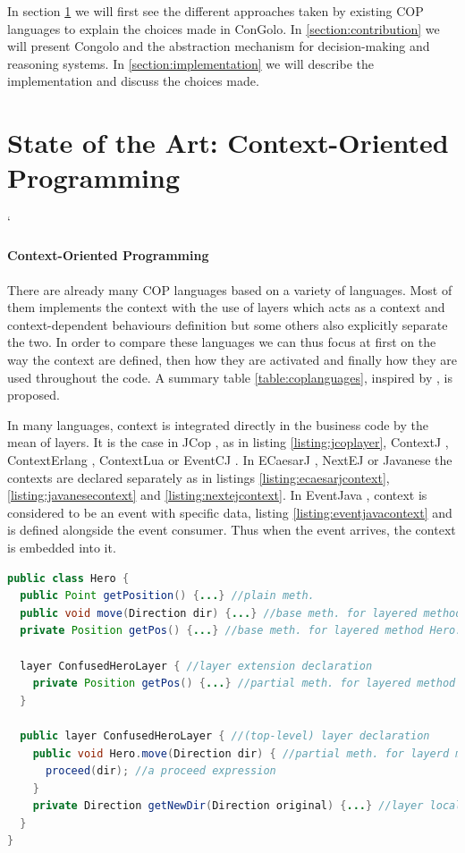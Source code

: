 \documentclass[a4paper]{article}
\begin{document}
In section \ref{section:stateoftheart} we will first see the different approaches taken by existing COP languages to explain the choices made in ConGolo. In \ref{section:contribution} we will present Congolo and the abstraction mechanism for decision-making and reasoning systems. In \ref{section:implementation} we will describe the implementation and discuss the choices made.

\section{State of the Art: Context-Oriented Programming}
\label{section:stateoftheart}
`
\paragraph{Context-Oriented Programming}
There are already many COP languages based on a variety of languages. Most of them implements the context with the use of layers which acts as a context and context-dependent behaviours definition but some others also explicitly separate the two. In order to compare these languages we can thus focus at first on the way the context are defined, then how they are activated and finally how they are used throughout the code. A summary table \ref{table:coplanguages}, inspired by \cite{appeltauer_comparison_2009}, is proposed.

In many languages, context is integrated directly in the business code by the mean of layers. It is the case in JCop \cite{appeltauer_declarative_2012}, as in listing \ref{listing:jcoplayer}, ContextJ \cite{appeltauer_dedicated_2008} \cite{appeltauer_improving_2009}, ContextErlang \cite{ghezzi_context_2010}, ContextLua \cite{wasty_contextlua:_2010} or EventCJ \cite{kamina_eventcj:_2011}. In ECaesarJ \cite{nunez_declarative_2009}, NextEJ \cite{kamina_towards_2009} or Javanese \cite{kamina_unified_2013} the contexts are declared separately as in listings \ref{listing:ecaesarjcontext}, \ref{listing:javanesecontext} and \ref{listing:nextejcontext}. In EventJava \cite{jayaram_context-oriented_2009}, context is considered to be an event with specific data, listing \ref{listing:eventjavacontext} and is defined alongside the event consumer. Thus when the event arrives, the context is embedded into it.

\begin{lstlisting}[float, language=Java, caption=JCop layer example, label={listing:jcoplayer}]
public class Hero {
  public Point getPosition() {...} //plain meth.
  public void move(Direction dir) {...} //base meth. for layered method Hero.move
  private Position getPos() {...} //base meth. for layered method Hero.getPos
  
  layer ConfusedHeroLayer { //layer extension declaration
    private Position getPos() {...} //partial meth. for layered method Hero.getPos
  }

  public layer ConfusedHeroLayer { //(top-level) layer declaration
    public void Hero.move(Direction dir) { //partial meth. for layerd meth. Hero.move
      proceed(dir); //a proceed expression
    }
    private Direction getNewDir(Direction original) {...} //layer local method
  }
}
\end{lstlisting}
\end{document}

